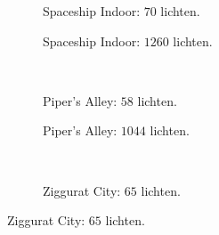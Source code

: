 \begin{figure}[t]
  \begin{adjustbox}{minipage=\textwidth, scale=0.55}
    \begin{subfigure}[b]{0.8\textwidth}
      \centering
      \def\svgwidth{\textwidth}
      
      \caption{Spaceship Indoor: $70$ lichten.}
      \label{fig:hs-seed-exec:indoor-low}
    \end{subfigure}
  \end{adjustbox}\hspace{-0.075\textwidth}  %
  \begin{adjustbox}{minipage=\textwidth, scale=0.55}
    \begin{subfigure}[b]{0.8\textwidth}
      \centering
      \def\svgwidth{\textwidth}
      
      \caption{Spaceship Indoor: $1260$ lichten.}
      \label{fig:hs-seed-exec:indoor-high}
    \end{subfigure}
  \end{adjustbox} \\
  \begin{adjustbox}{minipage=\textwidth, scale=0.55}
    \begin{subfigure}[b]{0.8\textwidth}
      \centering
      \def\svgwidth{\textwidth}
      
      \caption{Piper's Alley: $58$ lichten.}
      \label{fig:hs-seed-exec:alley-low}
    \end{subfigure}
  \end{adjustbox}\hspace{-0.075\textwidth}  %
  \begin{adjustbox}{minipage=\textwidth, scale=0.55}
    \begin{subfigure}[b]{0.8\textwidth}
      \centering
      \def\svgwidth{\textwidth}
      
      \caption{Piper's Alley: $1044$ lichten.}
      \label{fig:hs-seed-exec:alley-high}
    \end{subfigure}
  \end{adjustbox} \\
  \begin{adjustbox}{minipage=\textwidth, scale=0.55}
    \begin{subfigure}[b]{0.8\textwidth}
      \centering
      \def\svgwidth{\textwidth}
      
      \caption{Ziggurat City: $65$ lichten.}

\end{subfigure}
\end{adjustbox}
\end{figure}
